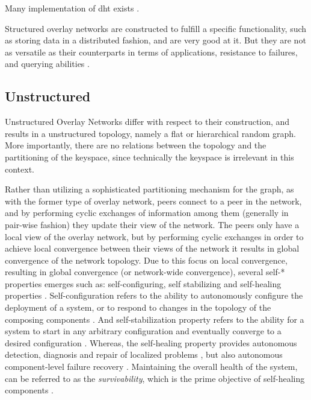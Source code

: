 \documentclass[12pt, titlepage]{uo_temp}
\begin{document}
     Many implementation of \gls{dht} exists \cite{sarmady2010survey} \cite{lua2005survey} \cite{p2p_collab}.

     Structured overlay networks are constructed to fulfill a specific functionality, such
     as storing data in a distributed fashion, and are very good at it. But they are not
     as versatile as their counterparts in terms of applications, resistance to failures,
     and querying abilities \cite{p2p_collab} \cite{lua2005survey}.
    
     \subsection{Unstructured}
     Unstructured Overlay Networks differ with respect to their construction, and results
     in a unstructured topology, namely a flat or hierarchical random graph. More
     importantly, there are no relations between the topology and the partitioning of the
     keyspace, since technically the keyspace is irrelevant in this context.
     
     Rather than utilizing a sophisticated partitioning mechanism for the graph, as with
     the former type of overlay network, peers connect to a peer in the network, and by
     performing cyclic exchanges of information among them (generally in pair-wise
     fashion) they update their view of the network. The peers only have a local view of
     the overlay network, but by performing cyclic exchanges in order to achieve local
     convergence between their views of the network it results in global convergence of
     the network topology. Due to this focus on local convergence, resulting in global
     convergence (or network-wide convergence), several self-* properties emerges such as:
     self-configuring, self stabilizing and self-healing properties \cite{pss}
     \cite{birman2007promise}.
     Self-configuration refers to the ability to autonomously configure the deployment of
     a system, or to respond to changes in the topology of the composing components
     \cite{kephart2003vision} \cite{berns2009dissecting}.
     And self-stabilization property refers to the ability for a system to start in any
     arbitrary configuration and eventually converge to a desired configuration
     \cite{berns2009dissecting} \cite{dolev2000self}.
     Whereas, the self-healing property provides autonomous detection, diagnosis and repair
     of localized problems \cite{kephart2003vision}, but also autonomous component-level
     failure recovery \cite{berns2009dissecting}. Maintaining the
     overall health of the system, can be referred to as the \emph{survivability}, which
     is the prime objective of self-healing components \cite{psaier2011survey} \cite{ghosh2007self}.
\end{document}
